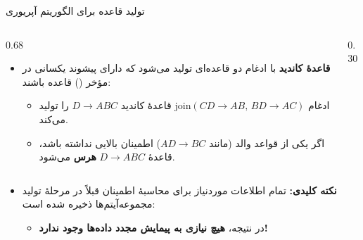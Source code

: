 \begin{frame}{تولید قاعده برای الگوریتم آپریوری}{}
\begin{columns}[T,onlytextwidth]
\begin{column}{0.68\textwidth}
\begin{itemize}\setlength{\itemsep}{4pt}\small
    \item \textbf{قاعدهٔ کاندید} با ادغام دو قاعده‌ای تولید می‌شود که دارای پیشوند یکسانی در مؤخر () قاعده باشند:
    \begin{itemize}\footnotesize
        \item ادغام $\mathrm{join}(CD \to AB,\, BD \to AC)$ قاعدهٔ کاندید $D \to ABC$ را تولید می‌کند.
        \item اگر یکی از قواعد والد (مانند $AD \to BC$) اطمینان بالایی نداشته باشد، قاعدهٔ $D \to ABC$ \textbf{هرس} می‌شود.
    \end{itemize}
\end{itemize}
\end{column}%
\begin{column}{0.30\textwidth}
\centering
\vspace{0.1cm}
\end{column}
\end{columns}

\vspace{0.25cm}
\begin{itemize}\setlength{\itemsep}{4pt}\small
    \item \textbf{نکته کلیدی:} تمام اطلاعات موردنیاز برای محاسبهٔ اطمینان قبلاً در مرحلهٔ تولید مجموعه‌آیتم‌ها ذخیره شده است:
    \par\vspace{2pt}\noindent{}\par\vspace{2pt}
    \begin{itemize}\footnotesize
        \item در نتیجه، \textbf{هیچ نیازی به پیمایش مجدد داده‌ها وجود ندارد!}
    \end{itemize}
\end{itemize}
\end{frame}
